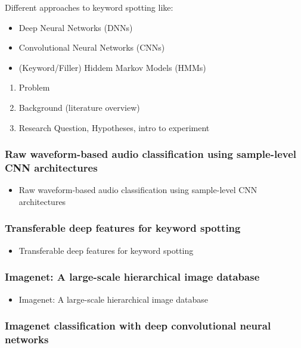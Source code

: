 \documentclass{article}
\theoremstyle{definition}
\theoremstyle{remark}
\begin{document}
Different approaches to keyword spotting like:

\begin{itemize}
	\item Deep Neural Networks (DNNs)
	\item Convolutional Neural Networks (CNNs)
	\item (Keyword/Filler) Hiddem Markov Models (HMMs)
\end{itemize}



\begin{enumerate}
	\item Problem
	\item Background (literature overview)
	\item Research Question, Hypotheses, intro to experiment
\end{enumerate}


\subsubsection{Raw waveform-based audio classification using sample-level CNN architectures}

\begin{itemize}
	\item Raw waveform-based audio classification using sample-level CNN architectures \cite{lee2017raw}
\end{itemize}


\subsubsection{Transferable deep features for keyword spotting}


\begin{itemize}
	\item Transferable deep features for keyword spotting \cite{retsinas2018transferable}
\end{itemize}

\subsubsection{Imagenet: A large-scale hierarchical image database}

\begin{itemize}
	\item Imagenet: A large-scale hierarchical image database \cite{deng2009imagenet}
\end{itemize}


\subsubsection{Imagenet classification with deep convolutional neural networks}
\end{document}

